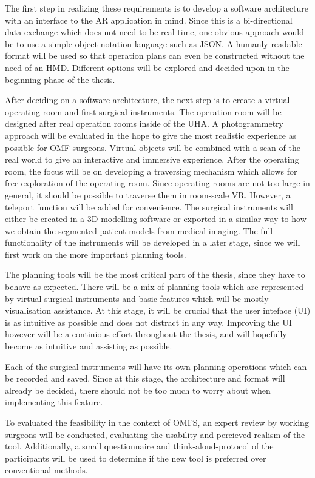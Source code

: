 The first step in realizing these requirements is to develop a software architecture with an interface to the AR application in mind.
Since this is a bi-directional data exchange which does not need to be real time, one obvious approach would be to use a simple object notation language such as JSON.
A humanly readable format will be used so that operation plans can even be constructed without the need of an HMD.
Different options will be explored and decided upon in the beginning phase of the thesis.

After deciding on a software architecture, the next step is to create a virtual operating room and first surgical instruments.
The operation room will be designed after real operation rooms inside of the UHA.
A photogrammetry approach will be evaluated in the hope to give the most realistic experience as possible for OMF surgeons.
Virtual objects will be combined with a scan of the real world to give an interactive and immersive experience.
After the operating room, the focus will be on developing a traversing mechanism which allows for free exploration of the operating room.
Since operating rooms are not too large in general, it should be possible to traverse them in room-scale VR.
However, a teleport function will be added for convenience.
The surgical instruments will either be created in a 3D modelling software or exported in a similar way to how we obtain the segmented patient models from medical imaging.
The full functionality of the instruments will be developed in a later stage, since we will first work on the more important planning tools.

The planning tools will be the most critical part of the thesis, since they have to behave as expected.
There will be a mix of planning tools which are represented by virtual surgical instruments and basic features which will be mostly visualisation assistance.
At this stage, it will be crucial that the user inteface (UI) is as intuitive as possible and does not distract in any way.
Improving the UI however will be a continious effort throughout the thesis, and will hopefully become as intuitive and assisting as possible.

Each of the surgical instruments will have its own planning operations which can be recorded and saved.
Since at this stage, the architecture and format will already be decided, there should not be too much to worry about when implementing this feature.

To evaluated the feasibility in the context of OMFS, an expert review by working surgeons will be conducted, evaluating the usability and percieved realism of the tool.
Additionally, a small questionnaire and think-aloud-protocol of the participants will be used to determine if the new tool is preferred over conventional methods.


